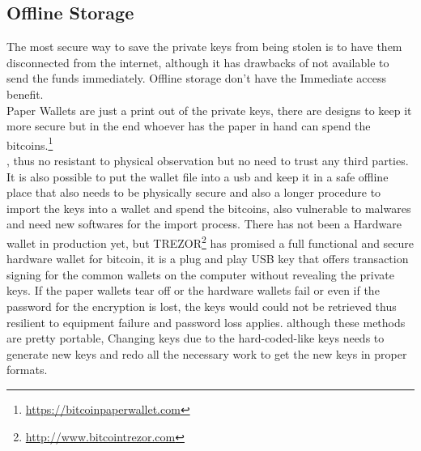 \subsection{Offline Storage}
\label{sec:offline storage}
The most secure way to save the private keys from being stolen is to have them disconnected from the internet, although it has drawbacks of not available to send the funds immediately. Offline storage don't have the Immediate access benefit.\\
Paper Wallets are just a print out of the private keys, there are designs to keep it more secure but in the end whoever has the paper in hand can spend the bitcoins.\footnote{\url {https://bitcoinpaperwallet.com}}\\, thus no resistant to physical observation but no need to trust any third parties.
It is also possible to put the wallet file into a usb and keep it in a safe offline place that also needs to be physically secure and also a longer procedure to import the keys into a wallet and spend the bitcoins, also vulnerable to malwares and need new softwares for the import process. There has not been a Hardware wallet in production yet, but TREZOR\footnote{\url {http://www.bitcointrezor.com}} has promised a full functional and secure hardware wallet for bitcoin, it is a plug and play USB key that offers transaction signing for the common wallets on the computer without revealing the private keys. If the paper wallets tear off or the hardware wallets fail or even if the password for the encryption is lost, the keys would could not be retrieved thus resilient to equipment failure and password loss applies. although these methods are pretty portable, Changing keys due to the hard-coded-like keys needs to generate new keys and redo all the necessary work to get the new keys in proper formats.


